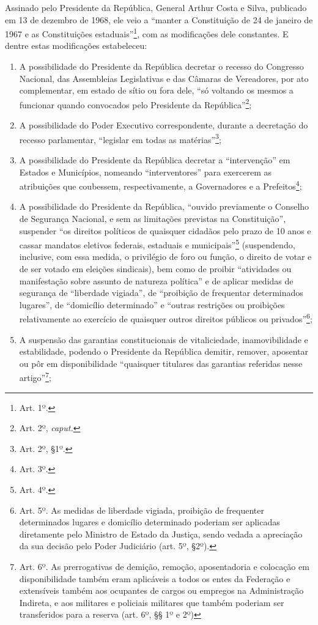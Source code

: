 Assinado pelo Presidente da República, General Arthur Costa e Silva,
publicado em 13 de dezembro de 1968, ele veio a ``manter a
Constituição de 24 de janeiro de 1967 e as Constituições
estaduais''\footnote{Art. 1º.}, com as modificações dele constantes. E
dentre estas modificações estabeleceu:

\begin{enumerate}
\item{}A possibilidade do Presidente da República decretar o recesso do
Congresso Nacional, das Assembleias Legislativas e das Câmaras de
Vereadores, por ato complementar, em estado de sítio ou fora dele,
``só voltando os mesmos a funcionar quando convocados pelo
Presidente da República''\footnote{Art. 2º, \emph{caput.}};

\item{}A possibilidade do Poder Executivo correspondente, durante a
decretação do recesso parlamentar, ``legislar em todas as
matérias''\footnote{Art. 2º, §1º.};

\item{}A possibilidade do Presidente da República decretar a
``intervenção'' em Estados e Municípios, nomeando
``interventores'' para exercerem as atribuições que coubessem,
respectivamente, a Governadores e a Prefeitos\footnote{Art. 3º.};

\item{}A possibilidade do Presidente da República, ``ouvido
previamente o Conselho de Segurança Nacional, e sem as limitações
previstas na Constituição'', suspender ``os direitos políticos de
quaisquer cidadãos pelo prazo de 10 anos e cassar mandatos eletivos
federais, estaduais e municipais''\footnote{Art. 4º.} (suspendendo,
inclusive, com essa medida, o privilégio de foro ou função, o direito de
votar e de ser votado em eleições sindicais), bem como de proibir
``atividades ou manifestação sobre assunto de natureza política''
e de aplicar medidas de segurança de ``liberdade vigiada'', de
``proibição de frequentar determinados lugares'', de
``domicílio determinado'' e ``outras restrições ou
proibições relativamente ao exercício de quaisquer outros direitos
públicos ou privados''\footnote{Art. 5º. As medidas de liberdade
  vigiada, proibição de frequenter determinados lugares e domicílio
  determinado poderiam ser aplicadas diretamente pelo Ministro de Estado
  da Justiça, sendo vedada a apreciação da sua decisão pelo Poder
  Judiciário (art. 5º, §2º).};

\item{}A suspensão das garantias constitucionais de vitaliciedade,
inamovibilidade e estabilidade, podendo o Presidente da República
demitir, remover, aposentar ou pôr em disponibilidade ``quaisquer
titulares das garantias referidas nesse artigo''\footnote{Art. 6º. As
  prerrogativas de demição, remoção, aposentadoria e colocação em
  disponibilidade também eram aplicáveis a todos os entes da Federação e
  extensíveis também aos ocupantes de cargos ou empregos na
  Administração Indireta, e aos militares e policiais militares que
  também poderiam ser transferidos para a reserva (art. 6º, §§ 1º e 2º)};


\end{enumerate}

